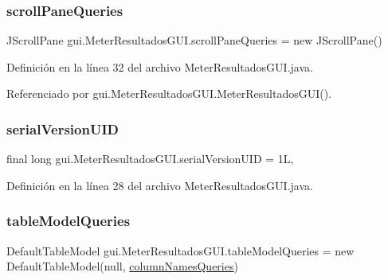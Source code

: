 \subsubsection{\texorpdfstring{scrollPaneQueries}{scrollPaneQueries}}
{\footnotesize\ttfamily J\+Scroll\+Pane gui.\+Meter\+Resultados\+G\+U\+I.\+scroll\+Pane\+Queries = new J\+Scroll\+Pane()\hspace{0.3cm}{\ttfamily [private]}}



Definición en la línea 32 del archivo Meter\+Resultados\+G\+U\+I.\+java.



Referenciado por gui.\+Meter\+Resultados\+G\+U\+I.\+Meter\+Resultados\+G\+U\+I().

\mbox{\label{classgui_1_1MeterResultadosGUI_a14d6fdea71a82da0b570b99c866e7464}} 
\subsubsection{\texorpdfstring{serialVersionUID}{serialVersionUID}}
{\footnotesize\ttfamily final long gui.\+Meter\+Resultados\+G\+U\+I.\+serial\+Version\+U\+ID = 1L\hspace{0.3cm}{\ttfamily [static]}, {\ttfamily [private]}}



Definición en la línea 28 del archivo Meter\+Resultados\+G\+U\+I.\+java.

\mbox{\label{classgui_1_1MeterResultadosGUI_a80d5962a095c4cb15ea9adde965fc730}} 
\subsubsection{\texorpdfstring{tableModelQueries}{tableModelQueries}}
{\footnotesize\ttfamily Default\+Table\+Model gui.\+Meter\+Resultados\+G\+U\+I.\+table\+Model\+Queries = new Default\+Table\+Model(null, \mbox{\hyperlink{classgui_1_1MeterResultadosGUI_a627fb2fd35893e8742ee7db4723cfd97}{column\+Names\+Queries}})\hspace{0.3cm}{\ttfamily [private]}}



